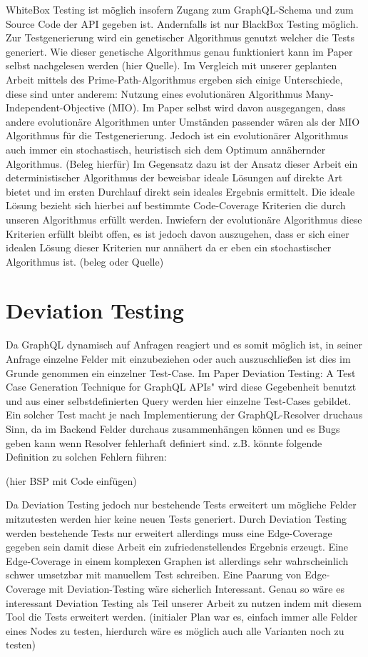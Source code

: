 WhiteBox Testing ist möglich insofern Zugang zum GraphQL-Schema und zum Source Code der API gegeben ist. Andernfalls ist
nur BlackBox Testing möglich. Zur Testgenerierung wird ein genetischer Algorithmus genutzt welcher die Tests generiert.
Wie dieser genetische Algorithmus genau funktioniert kann im Paper selbst nachgelesen werden (hier Quelle).
Im Vergleich mit unserer geplanten Arbeit mittels des Prime-Path-Algorithmus ergeben sich einige Unterschiede, diese sind
unter anderem: Nutzung eines evolutionären Algorithmus Many-Independent-Objective (MIO).
Im Paper selbst wird davon ausgegangen, dass andere evolutionäre Algorithmen unter Umständen passender wären als der MIO Algorithmus
für die Testgenerierung. Jedoch ist ein evolutionärer Algorithmus auch immer ein stochastisch, heuristisch sich dem Optimum annähernder Algorithmus. (Beleg hierfür)
Im Gegensatz dazu ist der Ansatz dieser Arbeit ein deterministischer Algorithmus der beweisbar ideale Lösungen auf direkte Art bietet
und im ersten Durchlauf direkt sein ideales Ergebnis ermittelt. Die ideale Lösung bezieht sich hierbei auf bestimmte
Code-Coverage Kriterien die durch unseren Algorithmus erfüllt werden.  Inwiefern der evolutionäre Algorithmus diese
Kriterien erfüllt bleibt offen, es ist jedoch davon auszugehen, dass er sich einer idealen Lösung dieser Kriterien nur
annähert da er eben ein stochastischer Algorithmus ist. (beleg oder Quelle)

\section{Deviation Testing}

Da GraphQL dynamisch auf Anfragen reagiert und es somit möglich ist, in seiner Anfrage einzelne Felder mit einzubeziehen
oder auch auszuschließen ist dies im Grunde genommen ein einzelner Test-Case.
Im Paper \" Deviation Testing: A Test Case Generation Technique for GraphQL APIs" wird diese Gegebenheit benutzt und
aus einer selbstdefinierten Query werden hier einzelne Test-Cases gebildet. Ein solcher Test macht je nach Implementierung
der GraphQL-Resolver druchaus Sinn, da im Backend Felder durchaus zusammenhängen können und es Bugs geben kann wenn
Resolver fehlerhaft definiert sind. z.B. könnte folgende Definition zu solchen Fehlern führen:

(hier BSP mit Code einfügen)

Da Deviation Testing jedoch nur bestehende Tests erweitert um mögliche Felder mitzutesten werden hier keine neuen Tests generiert.
Durch Deviation Testing werden bestehende Tests nur erweitert allerdings muss eine Edge-Coverage gegeben sein damit diese Arbeit
ein zufriedenstellendes Ergebnis erzeugt. Eine Edge-Coverage in einem komplexen Graphen ist allerdings sehr wahrscheinlich
schwer umsetzbar mit manuellem Test schreiben. Eine Paarung von Edge-Coverage mit Deviation-Testing wäre sicherlich Interessant.
Genau so wäre es interessant Deviation Testing als Teil unserer Arbeit zu nutzen indem mit diesem Tool die Tests erweitert werden.
(initialer Plan war es, einfach immer alle Felder eines Nodes zu testen, hierdurch wäre es möglich auch alle Varianten noch zu testen)

